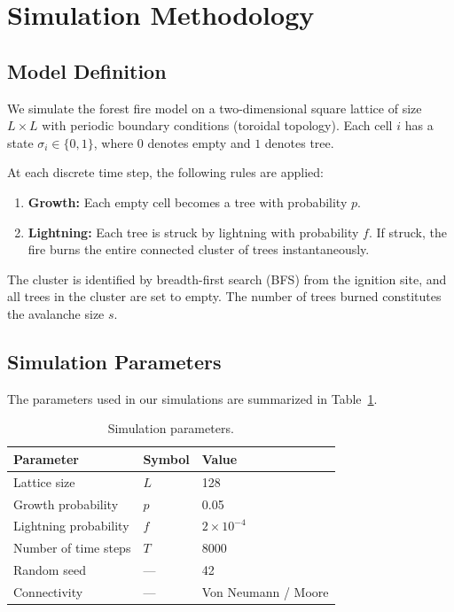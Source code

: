 \documentclass[12pt, a4paper, twocolumn]{article}
\begin{document}
\section{Simulation Methodology}
\label{sec:methods}

\subsection{Model Definition}

We simulate the forest fire model on a two-dimensional square lattice of size $L \times L$ with periodic boundary conditions (toroidal topology).
Each cell $i$ has a state $\sigma_i \in \{0, 1\}$, where $0$ denotes empty and $1$ denotes tree.

At each discrete time step, the following rules are applied:

\begin{enumerate}[leftmargin=*]
    \item \textbf{Growth:} Each empty cell becomes a tree with probability $p$.
    \item \textbf{Lightning:} Each tree is struck by lightning with probability $f$. If struck, the fire burns the entire connected cluster of trees instantaneously.
\end{enumerate}

The cluster is identified by breadth-first search (BFS) from the ignition site, and all trees in the cluster are set to empty.
The number of trees burned constitutes the avalanche size $s$.

\subsection{Simulation Parameters}

The parameters used in our simulations are summarized in Table~\ref{tab:params}.

\begin{table}[H]
\centering
\caption{Simulation parameters.}
\label{tab:params}
\begin{tabular}{@{}lll@{}}
\toprule
Parameter & Symbol & Value \\
\midrule
Lattice size & $L$ & 128 \\
Growth probability & $p$ & 0.05 \\
Lightning probability & $f$ & $2 \times 10^{-4}$ \\
Number of time steps & $T$ & 8000 \\
Random seed & --- & 42 \\
Connectivity & --- & Von Neumann / Moore \\
\bottomrule
\end{tabular}
\end{table}
\end{document}
